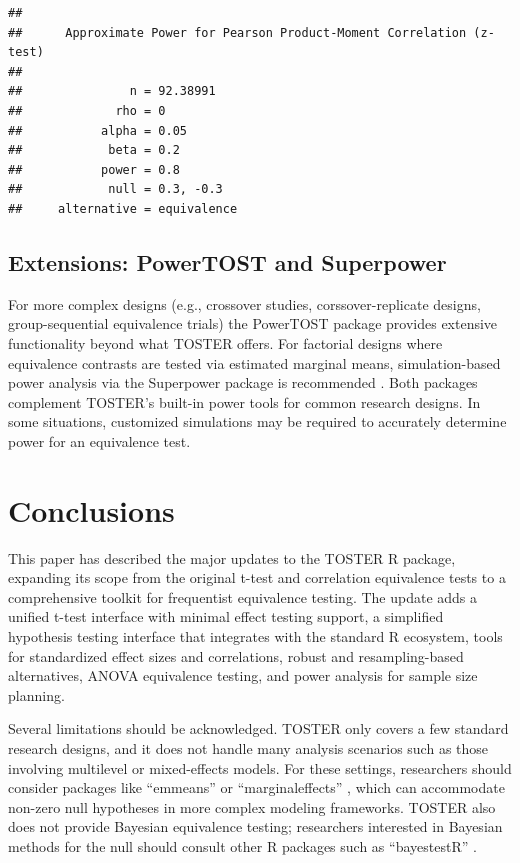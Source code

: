 \documentclass[]{interact}
\theoremstyle{plain}%
\theoremstyle{definition}
\theoremstyle{remark}
\begin{document}
\begin{verbatim}
## 
##      Approximate Power for Pearson Product-Moment Correlation (z-test) 
## 
##               n = 92.38991
##             rho = 0
##           alpha = 0.05
##            beta = 0.2
##           power = 0.8
##            null = 0.3, -0.3
##     alternative = equivalence
\end{verbatim}

\subsection{Extensions: PowerTOST and
Superpower}\label{extensions-powertost-and-superpower}

For more complex designs (e.g., crossover studies, corssover-replicate
designs, group-sequential equivalence trials) the PowerTOST package
\citep{PowerTOST} provides extensive functionality beyond what TOSTER
offers. For factorial designs where equivalence contrasts are tested via
estimated marginal means, simulation-based power analysis via the
Superpower package is recommended \citep{Lakens_Caldwell_2021}. Both
packages complement TOSTER's built-in power tools for common research
designs. In some situations, customized simulations may be required to
accurately determine power for an equivalence test.

\newpage

\section{Conclusions}\label{conclusions}

This paper has described the major updates to the TOSTER R package,
expanding its scope from the original t-test and correlation equivalence
tests to a comprehensive toolkit for frequentist equivalence testing.
The update adds a unified t-test interface with minimal effect testing
support, a simplified hypothesis testing interface that integrates with
the standard R ecosystem, tools for standardized effect sizes and
correlations, robust and resampling-based alternatives, ANOVA
equivalence testing, and power analysis for sample size planning.

Several limitations should be acknowledged. TOSTER only covers a few
standard research designs, and it does not handle many analysis
scenarios such as those involving multilevel or mixed-effects models.
For these settings, researchers should consider packages like
``emmeans'' \citep{emmeans} or ``marginaleffects''
\citep{marginaleffects}, which can accommodate non-zero null hypotheses
in more complex modeling frameworks. TOSTER also does not provide
Bayesian equivalence testing; researchers interested in Bayesian methods
for the null should consult other R packages such as ``bayestestR''
\citep{bayestestR}.
\end{document}
